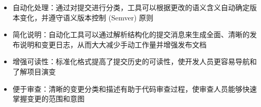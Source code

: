 \begin{itemize}
\item
自动化处理：通过对提交进行分类，工具可以根据更改的语义含义自动确定版本变化，并遵守语义版本控制 (Semver) 原则

\item
简化说明：自动化工具可以通过解析结构化的提交消息来生成全面、清晰的发布说明和变更日志，从而大大减少手动工作量并增强发布文档

\item
增强可读性：标准化格式提高了提交历史的可读性，使开发人员更容易导航和了解项目演变

\item
便于审查：清晰的变更分类和描述有助于代码审查过程，使审查人员能够快速掌握变更的范围和意图
\end{itemize}















































